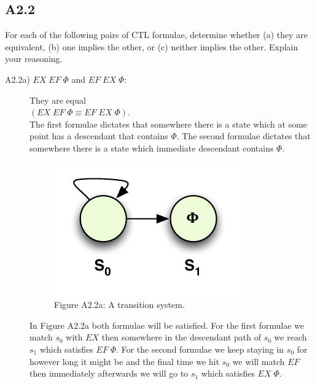 \documentclass[12pt]{report}
\begin{document}
\subsection*{A2.2}
For each of the following pairs of CTL formulae, determine whether (a) they are equivalent, (b) one implies the other, or (c) neither implies the other. Explain your reasoning.
\begin{description}
	\item[A2.2a) $EX \; EF \; \Phi$ and $EF \; EX \; \Phi$:]
		They are equal\\
		$\left(EX \; EF \; \Phi \equiv EF \; EX \; \Phi\right)$.\\
		The first formulae dictates that somewhere there is a state which at some point has a descendant that contains $\Phi$. The second formulae dictates that somewhere there is a state which immediate descendant contains $\Phi$.
		\begin{figure}[H]
			\centering
			\includegraphics[scale=0.75]{../GFX/Answer-A2-2a.pdf}\\
			Figure A2.2a: A transition system.
		\end{figure}
		In Figure A2.2a both formulae will be satisfied. For the first formulae we match $s_0$ with $EX$ then somewhere in the descendant path of $s_0$ we reach $s_1$ which satisfies $EF \; \Phi$. For the second formulae we keep staying in $s_0$ for however long it might be and the final time we hit $s_0$ we will match $EF$ then immediately afterwards we will go to $s_1$ which satisfies $EX \; \Phi$.
		

\end{description}
\end{document}
